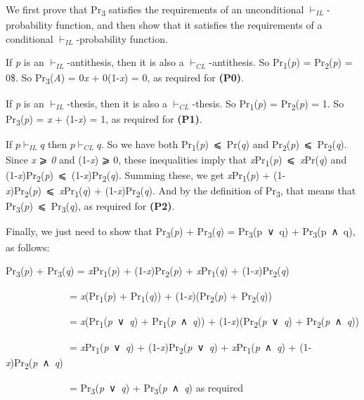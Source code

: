 \documentclass[
  10pt,
  letterpaper,
  DIV=11,
  numbers=noendperiod,
  twoside]{scrartcl}
\begin{document}
We first prove that Pr\textsubscript{3} satisfies the requirements of an
unconditional \(\vdash_{IL}\)-probability function, and then show that
it satisfies the requirements of a conditional
\(\vdash_{IL}\)-probability function.

If \emph{p} is an \(\vdash_{IL}\)-antithesis, then it is also a
\(\vdash_{CL}\)-antithesis. So Pr\textsubscript{1}(\emph{p}) =
Pr\textsubscript{2}(\emph{p}) = 0\$. So Pr\textsubscript{3}(\emph{A}) =
0\emph{x} + 0(1-\emph{x}) = 0, as required for \textbf{(P0)}.

If \emph{p} is an \(\vdash_{IL}\)-thesis, then it is also a
\(\vdash_{CL}\)-thesis. So Pr\textsubscript{1}(\emph{p}) =
Pr\textsubscript{2}(\emph{p}) = 1. So Pr\textsubscript{3}(\emph{p}) =
\emph{x} + (1-\emph{x}) = 1, as required for \textbf{(P1)}.

If \(p \vdash_{IL} q\) then \(p \vdash_{CL} q\). So we have both
Pr\textsubscript{1}(\emph{p})~⩽~Pr(\emph{q}) and
Pr\textsubscript{2}(\emph{p})~⩽~Pr\textsubscript{2}(\emph{q}). Since
\emph{x} ⩾ \emph{0} and (1-\emph{x}) ⩾ 0, these inequalities imply that
\emph{x}Pr\textsubscript{1}(\emph{p})~⩽~\emph{x}Pr(\emph{q}) and
(1-\emph{x})Pr\textsubscript{2}(\emph{p})~⩽~(1-\emph{x})Pr\textsubscript{2}(\emph{q}).
Summing these, we get \emph{x}Pr\textsubscript{1}(\emph{p}) +
(1-\emph{x})Pr\textsubscript{2}(\emph{p})~⩽~\emph{x}Pr\textsubscript{1}(\emph{q})
+ (1-\emph{x})Pr\textsubscript{2}(\emph{q}). And by the definition of
Pr\textsubscript{3}, that means that
Pr\textsubscript{3}(\emph{p})~⩽~Pr\textsubscript{3}(\emph{q}), as
required for \textbf{(P2)}.

Finally, we just need to show that Pr\textsubscript{3}(\emph{p}) +
Pr\textsubscript{3}(\emph{q}) = Pr\textsubscript{3}(p~∨~q) +
Pr\textsubscript{3}(p~∧~q), as follows:

Pr\textsubscript{3}(\emph{p}) + Pr\textsubscript{3}(\emph{q}) =
\emph{x}Pr\textsubscript{1}(\emph{p}) +
(1-\emph{x})Pr\textsubscript{2}(\emph{p}) +
\emph{x}Pr\textsubscript{1}(\emph{q}) +
(1-\emph{x})Pr\textsubscript{2}(\emph{q})\\
\strut ~~~~~~~~~~~~~= \emph{x}(Pr\textsubscript{1}(\emph{p}) +
Pr\textsubscript{1}(\emph{q})) +
(1-\emph{x})(Pr\textsubscript{2}(\emph{p}) +
Pr\textsubscript{2}(\emph{q}))\\
\strut ~~~~~~~~~~~~~= \emph{x}(Pr\textsubscript{1}(\emph{p}~∨~\emph{q})
+ Pr\textsubscript{1}(\emph{p}~∧~\emph{q})) +
(1-\emph{x})(Pr\textsubscript{2}(\emph{p}~∨~\emph{q}) +
Pr\textsubscript{2}(\emph{p}~∧~\emph{q}))\\
\strut ~~~~~~~~~~~~~= \emph{x}Pr\textsubscript{1}(\emph{p}~∨~\emph{q}) +
(1-\emph{x})Pr\textsubscript{2}(\emph{p}~∨~\emph{q}) +
\emph{x}Pr\textsubscript{1}(\emph{p}~∧~\emph{q}) +
(1-\emph{x})Pr\textsubscript{2}(\emph{p}~∧~\emph{q})\\
\strut ~~~~~~~~~~~~~= Pr\textsubscript{3}(\emph{p}~∨~\emph{q}) +
Pr\textsubscript{3}(\emph{p}~∧~\emph{q}) as required\\
\end{document}
